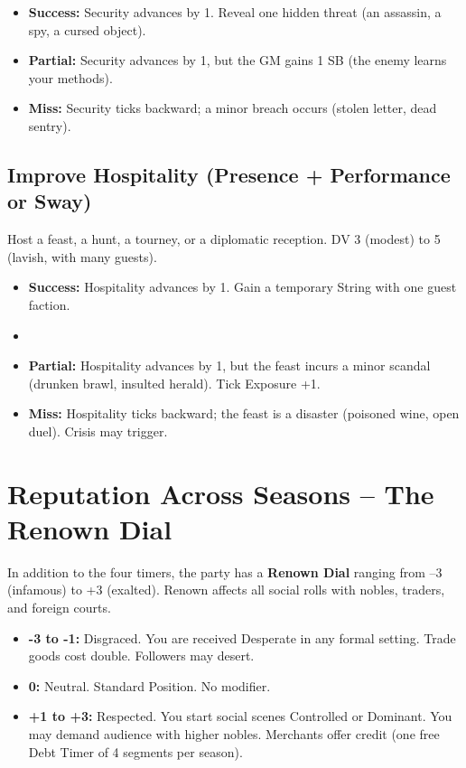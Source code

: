 \documentclass[11pt]{article}
\begin{document}
\begin{itemize}
    \item \textbf{Success:} Security advances by 1. Reveal one hidden threat (an assassin, a spy, a cursed object).
    \item \textbf{Partial:} Security advances by 1, but the GM gains 1 SB (the enemy learns your methods).
    \item \textbf{Miss:} Security ticks backward; a minor breach occurs (stolen letter, dead sentry).
\end{itemize}

\subsection*{Improve Hospitality (Presence + Performance or Sway)}
Host a feast, a hunt, a tourney, or a diplomatic reception. DV 3 (modest) to 5 (lavish, with many guests).

\begin{itemize}
    \item \textbf{Success:} Hospitality advances by 1. Gain a temporary String with one guest faction.
    \item \item \textbf{Partial:} Hospitality advances by 1, but the feast incurs a minor scandal (drunken brawl, insulted herald). Tick Exposure +1.
    \item \textbf{Miss:} Hospitality ticks backward; the feast is a disaster (poisoned wine, open duel). Crisis may trigger.
\end{itemize}

\section{Reputation Across Seasons -- The Renown Dial}

In addition to the four timers, the party has a \textbf{Renown Dial} ranging from --3 (infamous) to +3 (exalted). Renown affects all social rolls with nobles, traders, and foreign courts.

\begin{itemize}
    \item \textbf{-3 to -1:} Disgraced. You are received Desperate in any formal setting. Trade goods cost double. Followers may desert.
    \item \textbf{0:} Neutral. Standard Position. No modifier.
    \item \textbf{+1 to +3:} Respected. You start social scenes Controlled or Dominant. You may demand audience with higher nobles. Merchants offer credit (one free Debt Timer of 4 segments per season).
\end{itemize}
\end{document}
